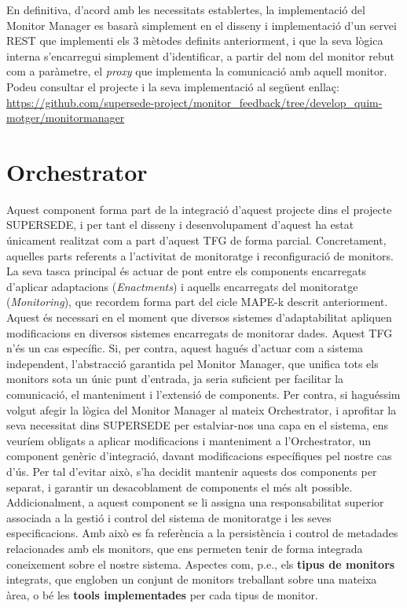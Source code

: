 En definitiva, d'acord amb les necessitats establertes, la implementació del Monitor Manager es basarà simplement en el disseny i implementació d'un servei REST que implementi els 3 mètodes definits anteriorment, i que la seva lògica interna s'encarregui simplement d'identificar, a partir del nom del monitor rebut com a paràmetre, el \textit{proxy} que implementa la comunicació amb aquell monitor.\\

Podeu consultar el projecte i la seva implementació al següent enllaç:  \url{https://github.com/supersede-project/monitor_feedback/tree/develop_quim-motger/monitormanager}

\section{Orchestrator}

Aquest component forma part de la integració d'aquest projecte dins el projecte SUPERSEDE, i per tant el disseny i desenvolupament d'aquest ha estat únicament realitzat com a part d'aquest TFG de forma parcial. Concretament, aquelles parts referents a l'activitat de monitoratge i reconfiguració de monitors.\\

La seva tasca principal és actuar de pont entre els components encarregats d'aplicar adaptacions (\textit{Enactments}) i aquells encarregats del monitoratge (\textit{Monitoring}), que recordem forma part del cicle MAPE-k descrit anteriorment. Aquest és necessari en el moment que diversos sistemes d'adaptabilitat apliquen modificacions en diversos sistemes encarregats de monitorar dades. Aquest TFG n'és un cas específic. Si, per contra, aquest hagués d'actuar com a sistema independent, l'abstracció garantida pel Monitor Manager, que unifica tots els monitors sota un únic punt d'entrada, ja seria suficient per facilitar la comunicació, el manteniment i l'extensió de components. Per contra, si haguéssim volgut afegir la lògica del Monitor Manager al mateix Orchestrator, i aprofitar la seva necessitat dins SUPERSEDE per estalviar-nos una capa en el sistema, ens veuríem obligats a aplicar modificacions i manteniment a l'Orchestrator, un component genèric d'integració, davant modificacions específiques pel nostre cas d'ús. Per tal d'evitar això, s'ha decidit mantenir aquests dos components per separat, i garantir un desacoblament de components el més alt possible.\\

Addicionalment, a aquest component se li assigna una responsabilitat superior associada a la gestió i control del sistema de monitoratge i les seves especificacions. Amb això es fa referència a la persistència i control de metadades relacionades amb els monitors, que ens permeten tenir de forma integrada coneixement sobre el nostre sistema. Aspectes com, p.e., els \textbf{tipus de monitors} integrats, que engloben un conjunt de monitors treballant sobre una mateixa àrea, o bé les \textbf{tools implementades} per cada tipus de monitor.\\

